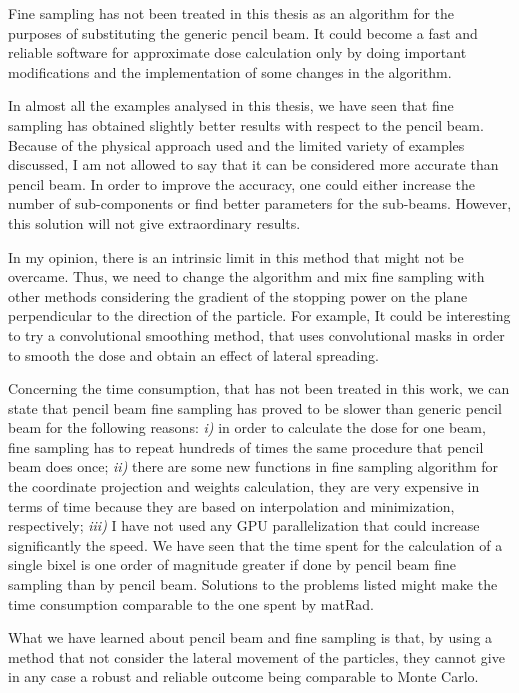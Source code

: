 \documentclass[12pt, a4paper, twoside]{book}
\begin{document}
Fine sampling has not been treated in this thesis as an algorithm for the purposes of substituting the generic pencil beam. It could become a fast and reliable software for approximate dose calculation only by doing important modifications and the implementation of some changes in the algorithm.

In almost all the examples analysed in this thesis, we have seen that fine sampling has obtained slightly better results with respect to the pencil beam. Because of the physical approach used and the limited variety of examples discussed, I am not allowed to say that it can be considered more accurate than pencil beam. In order to improve the accuracy, one could either increase the number of sub-components or find better parameters for the sub-beams. However, this solution will not give extraordinary results.


In my opinion, there is an intrinsic limit in this method that might not be overcame. Thus, we need to change the algorithm and mix fine sampling with other methods considering the gradient of the stopping power on the plane perpendicular to the direction of the particle. For example, It could be interesting to try a convolutional smoothing method, that uses convolutional masks in order to smooth the dose and obtain an effect of lateral spreading.

Concerning the time consumption, that has not been treated in this work, we can state that pencil beam fine sampling has proved to be slower than generic pencil beam for the following reasons: \emph{i)} in order to calculate the dose for one beam, fine sampling has to repeat hundreds of times the same procedure that pencil beam does once; \emph{ii)} there are some new functions in fine sampling algorithm for the coordinate projection and weights calculation, they are very expensive in terms of time because they are based on interpolation and minimization, respectively; \emph{iii)} I have not used any GPU parallelization that could increase significantly the speed.
We have seen that the time spent for the calculation of a single bixel is one order of magnitude greater if done by pencil beam fine sampling than by pencil beam.
Solutions to the problems listed might make the time consumption comparable to the one spent by matRad.

What we have learned about pencil beam and fine sampling is that, by using a method that not consider the lateral movement of the particles, they cannot give in any case a robust and reliable outcome being comparable to Monte Carlo.
\end{document}
